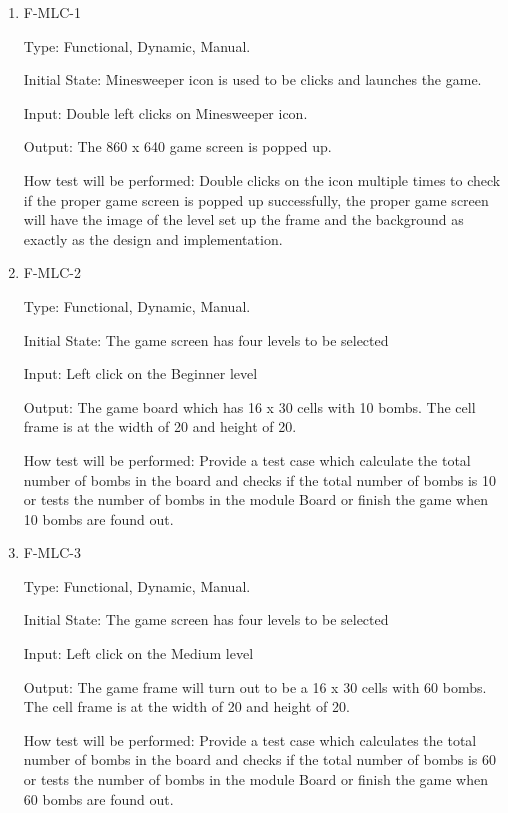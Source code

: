 \documentclass[12pt, titlepage]{article}
\begin{document}
\begin{enumerate}

\item{F-MLC-1\\}

Type: Functional, Dynamic, Manual.
					
Initial State: Minesweeper icon is used to be clicks and launches the game.
					
Input: Double left clicks on Minesweeper icon.
					
Output: The 860 x 640 game screen is popped up.
					
How test will be performed: Double clicks on the icon multiple times to check if the proper game screen is popped up successfully, the proper game screen will have the image of the level set up the frame and the background as exactly as the design and implementation.
					
\item{F-MLC-2\\}

Type: Functional, Dynamic, Manual.
					
Initial State: The game screen has four levels to be selected
					
Input: Left click on the Beginner level
					
Output: The game board which has 16 x 30 cells with 10 bombs. The cell frame is at the width of 20 and height of 20.
					
How test will be performed: Provide a test case which calculate the total number of bombs in the board and checks if the total number of bombs is 10 or tests the number of bombs in the module Board or finish the game when 10 bombs are found out.

\item{F-MLC-3\\}

Type: Functional, Dynamic, Manual.
					
Initial State: The game screen has four levels to be selected
					
Input: Left click on the Medium level
					
Output: The game frame will turn out to be a 16 x 30 cells with 60 bombs. The cell frame is at the width of 20 and height of 20.
					
How test will be performed: Provide a test case which calculates the total number of bombs in the board and checks if the total number of bombs is 60 or tests the number of bombs in the module Board or finish the game when 60 bombs are found out.


\end{enumerate}
\end{document}
